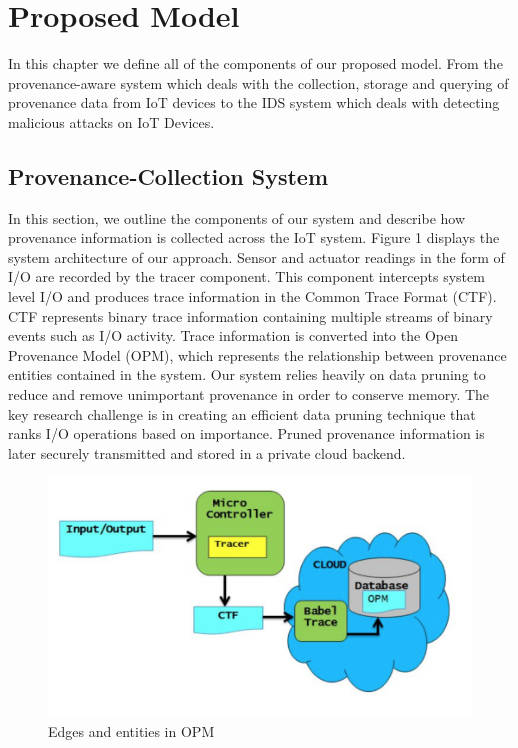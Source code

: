 
\chapter{Proposed Model}

In this chapter we define all of the components of our proposed model. From the provenance-aware system which deals with the collection, storage and querying of provenance data from IoT devices to the  IDS system which deals with detecting malicious attacks on IoT Devices.

\section{Provenance-Collection System}

In this section, we outline the components of our system and describe how provenance information is collected across the IoT system. Figure 1 displays the system architecture of our approach. Sensor and actuator readings in the form of I/O are recorded by the tracer component. This component intercepts system level I/O and produces trace information in the Common Trace Format (CTF). CTF represents binary trace information containing multiple streams of binary events such as I/O activity. Trace information is converted into the Open Provenance Model (OPM), which represents the relationship between provenance entities contained in the system. Our system relies heavily on data pruning to reduce and remove unimportant provenance in order to conserve memory. The key research challenge is in creating an efficient data pruning technique that ranks I/O operations based on importance. Pruned provenance information is later securely transmitted and stored in a private cloud backend.

\begin{figure}[h!]
\begin{center}

\includegraphics{architecture.PNG}    
\end{center}
\caption{Edges and entities in OPM}
\label{autom}
\end{figure}

